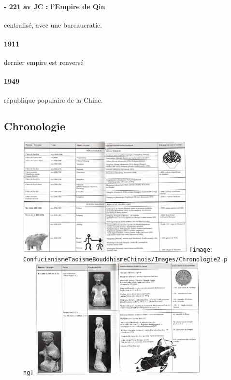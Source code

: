 \paragraph{- 221 av JC : l'Empire de Qin} centralisé, avec une bureaucratie.

\paragraph{1911} dernier empire est renversé
\paragraph{1949} république populaire de la Chine.

\subsection{Chronologie}
\begin{figure}[!h]
    \centering
\includegraphics[width=0.8\textwidth]{ConfucianismeTaoismeBouddhismeChinois/Images/Chronologie1.jpg}
\texttt{[image: ConfucianismeTaoismeBouddhismeChinois/Images/Chronologie2.png]}
\includegraphics[width=0.8\textwidth]{ConfucianismeTaoismeBouddhismeChinois/Images/Chronologie3.png}

    \label{fig:enter-label}
\end{figure}

